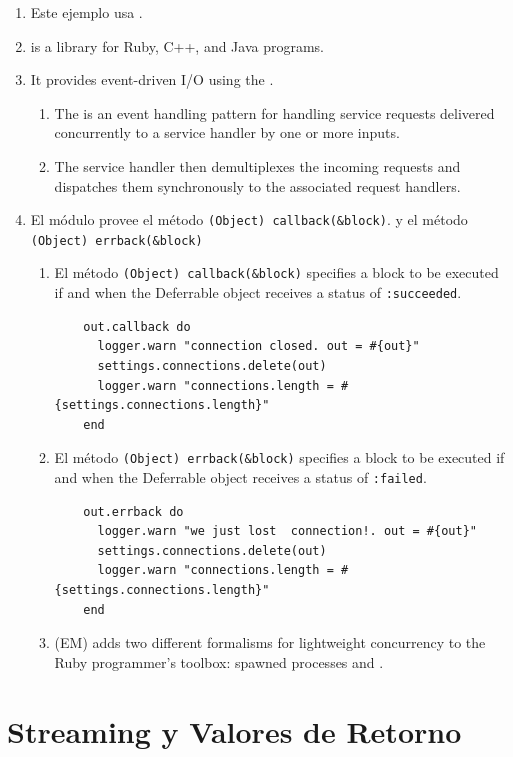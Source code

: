 \begin{enumerate}
\item 
Este ejemplo usa
\eventmachine{}.
\item 
\eventmachine {} 
is a library for Ruby, C++, and Java programs. 
\item 
It provides event-driven I/O using the . 
\begin{enumerate}
\item 
The  is an event handling pattern for
handling service requests delivered concurrently to a service handler
by one or more inputs.
\item 
The service handler then demultiplexes the incoming requests and
dispatches them synchronously to the associated request handlers.
\end{enumerate}
\item 
El módulo
provee el método \verb|(Object) callback(&block)|.
y el método \verb|(Object) errback(&block)| 
\begin{enumerate}
\item 
El método \verb|(Object) callback(&block)|
specifies a block to be executed if and when the Deferrable object receives a status of \verb|:succeeded|.
\begin{verbatim}
    out.callback do 
      logger.warn "connection closed. out = #{out}"
      settings.connections.delete(out) 
      logger.warn "connections.length = #{settings.connections.length}"
    end
\end{verbatim}
\item 
El método \verb|(Object) errback(&block)| 
specifies a block to be executed if and when the Deferrable object receives
a status of \verb|:failed|.
\begin{verbatim}
    out.errback do
      logger.warn "we just lost  connection!. out = #{out}"
      settings.connections.delete(out)
      logger.warn "connections.length = #{settings.connections.length}"
    end
\end{verbatim}
\item 
\eventmachine{} (EM) adds two different formalisms for lightweight concurrency to the Ruby programmer’s toolbox: spawned processes and .
\end{enumerate}
\end{enumerate}


\section{Streaming y Valores de Retorno}


